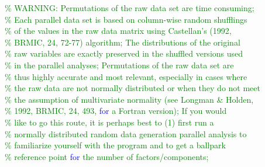 \hspace{1mm}\indent \textcolor{green}{\%  WARNING: Permutations of the raw data set are time consuming; }\\ 
\hspace{1mm}\indent \textcolor{green}{\%  Each parallel data set is based on column-wise random shufflings }\\ 
\hspace{1mm}\indent \textcolor{green}{\%  of the values in the raw data matrix using Castellan's (1992,  }\\ 
\hspace{1mm}\indent \textcolor{green}{\%  BRMIC, 24, 72-77) algorithm; The distributions of the original  }\\ 
\hspace{1mm}\indent \textcolor{green}{\%  raw variables are exactly preserved in the shuffled versions used }\\ 
\hspace{1mm}\indent \textcolor{green}{\%  in the parallel analyses; Permutations of the raw data set are }\\ 
\hspace{1mm}\indent \textcolor{green}{\%  thus highly accurate and most relevant, especially in cases where }\\ 
\hspace{1mm}\indent \textcolor{green}{\%  the raw data are not normally distributed or when they do not meet }\\ 
\hspace{1mm}\indent \textcolor{green}{\%  the assumption of multivariate normality (see Longman \& Holden, }\\ 
\hspace{1mm}\indent \textcolor{green}{\%  1992, BRMIC, 24, 493, \textcolor{blue}{for} a Fortran version); If you would }\\ 
\hspace{1mm}\indent \indent \textcolor{green}{\%  like to go this route, it is perhaps best to (1) first run a  }\\ 
\hspace{1mm}\indent \indent \textcolor{green}{\%  normally distributed random data generation parallel analysis to }\\ 
\hspace{1mm}\indent \indent \textcolor{green}{\%  familiarize yourself with the program and to get a ballpark }\\ 
\hspace{1mm}\indent \indent \textcolor{green}{\%  reference point \textcolor{blue}{for} the number of factors/components; }\\ 
